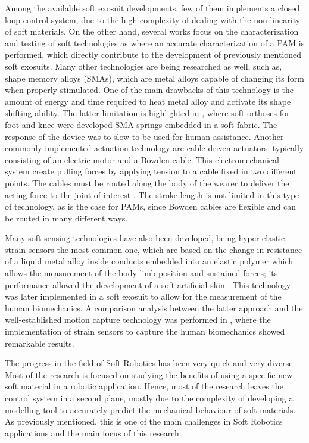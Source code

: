 Among the available soft exosuit developments, few of them implements a closed loop control system, due to the high complexity of dealing with the non-linearity of soft materials. On the other hand, several works focus on the characterization and testing of soft technologies as \cite{wehner2012exp} where an accurate characterization of a PAM is performed, which directly contribute to the development of previously mentioned soft exosuits. Many other technologies are being researched as well, such as, shape memory alloys (SMAs), which are metal alloys capable of changing its form when  properly stimulated. One of the main drawbacks of this technology is the amount of energy and time required to heat metal alloy and activate its shape shifting ability. The latter limitation is highlighted in \cite{Stirling2011}, where soft orthoses for foot and knee were developed SMA springs embedded in a soft fabric. The response of the device was to slow to be used for human assistance. Another commonly implemented actuation technology are cable-driven actuators, typically consisting of an electric motor and a Bowden cable. This electromechanical system create pulling forces by applying tension to a cable fixed in two different points. The cables must be routed along the body of the wearer to deliver the acting force to the joint of interest \cite{asbeck2013biologically,asbeck2015biologically}. The stroke length is not limited in this type of technology, as is the case for PAMs, since Bowden cables are flexible and can be routed in many different ways.

Many soft sensing technologies have also been developed, being hyper-elastic strain sensors the most common one, which are based on the change in resistance of a liquid metal alloy inside conducts embedded into an elastic polymer which allows the measurement of the body limb position and sustained forces; its performance allowed the development of a soft artificial skin \cite{park2012design}. This technology was later implemented in a soft exosuit to allow for the measurement of the human biomechanics. A comparison analysis between the latter approach and the well-established motion capture technology was performed in \cite{mengucc2014wearable}, where the implementation of strain sensors to capture the human biomechanics showed remarkable results.

The progress in the field of Soft Robotics has been very quick and very diverse. Most of the research is focused on studying the benefits of using a specific new soft material in a robotic application. Hence, most of the research leaves the control system in a second plane, mostly due to the complexity of developing a modelling tool to accurately predict the mechanical behaviour of soft materials. As previously mentioned, this is one of the main challenges in Soft Robotics applications and the main focus of this research.


